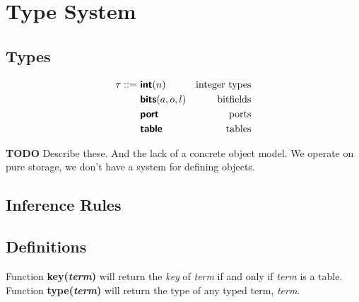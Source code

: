 
\section{Type System}

\subsection{Types}


\begin{align*}
\tau ::=~& \bm{\mathsf{{int}}}(n)        & \text{integer types} \\
         & \bm{\mathsf{{bits}}}(a, o, l) & \text{bitfields} \\
         & \bm{\mathsf{{port}}}          & \text{ports} \\
         & \bm{\mathsf{{table}}}         & \text{tables} \\
\end{align*}

\textbf{TODO} Describe these. And the lack of a concrete object model. We
operate on pure storage, we don't have a system for defining objects.

\subsection{Inference Rules}
\subsection*{Definitions}
Function \textbf{key(\textit{term})} will return the \textit{key} of \textit{term} if and only if \textit{term} is a table. \newline
Function \textbf{type(\textit{term})} will return the type of any typed term, \textit{term}.

